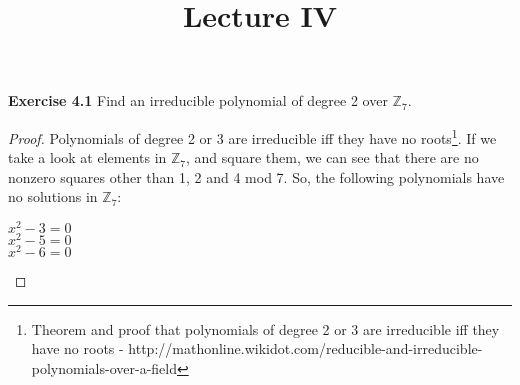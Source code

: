 \documentclass[a4paper]{article}
\title{\vspace{-2cm}Lecture IV\vspace{-2cm}}
\date{}
\begin{document}
\maketitle
\noindent \textbf{Exercise 4.1} Find an irreducible polynomial of degree 2 over $\mathbb{Z}_{7}$.
\begin{proof}
Polynomials of degree 2 or 3 are irreducible iff they have no roots\footnote{Theorem and proof that polynomials of degree 2 or 3 are irreducible iff they have no roots - http://mathonline.wikidot.com/reducible-and-irreducible-polynomials-over-a-field}. If we take a look at elements in $\mathbb{Z}_{7}$, and square them, we can see that there are no nonzero squares other than 1, 2 and 4 mod 7. So, the following polynomials have no solutions in $\mathbb{Z}_{7}$:
\begin{center}
$x^2 - 3 = 0$\\
$x^2 - 5 = 0$\\
$x^2 - 6 = 0$	
\end{center}
\end{proof}
\end{document}
